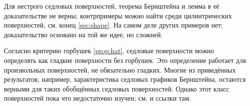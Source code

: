 Для нестрого седловых поверхностей, теорема Бернштейна и лемма в её доказательстве не верны;
контрпримеры можно найти среди цилинтрических поверхностей, см. конец \ref{sec:shape}.
На самом деле других примеров нет;
доказательство основано на той же идее, но сложней.

Согласно критерию горбушек \ref{prop:hat}, седловые поверхности можно определять как гладкие поверхности без горбушек.
Это определение работает для произвольных поверхностей, не обязательно гладких.
Многие из приведённых результатов, например, характеристика седловых графиков Бернштейна, остаются верными для таких обобщённых седловых поверхностей.
Однако этот класс поверхностей пока что недостаточно изучен; см. \cite[глава 4]{alexander-kapovitch-petrunin2019} и ссылки там.

